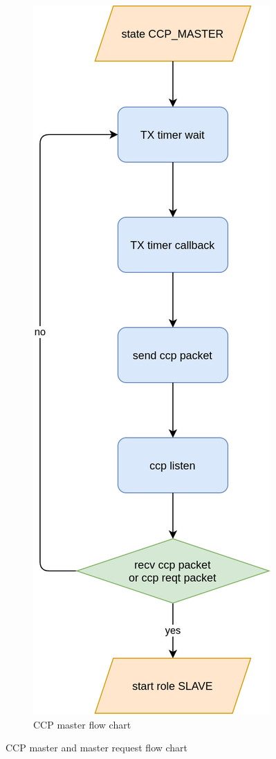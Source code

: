 \documentclass[\main/main.tex]{subfiles}
\begin{document}
\begin{figure}
\begin{subfigure}[b]{0.47\textwidth}
    \end{subfigure}
    \hfill
    \begin{subfigure}[b]{0.47\textwidth}
        \begin{center}
            \includegraphics[scale=0.3]{ccp_master_flow_chart.png}
        \end{center}
        \caption{CCP master flow chart}
        \label{fig:ccp_master_flow_chart}
    \end{subfigure}
    \caption{CCP master and master request flow chart}
\end{figure}
\end{document}
